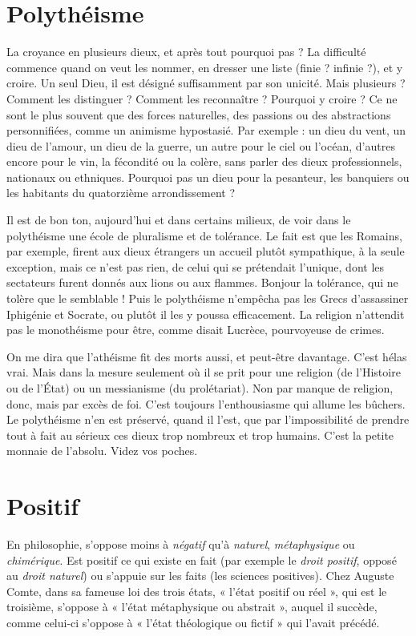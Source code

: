 \section{Polythéisme}
La croyance en plusieurs dieux, et après tout pourquoi pas ?
La difficulté commence quand on veut les nommer, en
dresser une liste (finie ? infinie ?), et y croire. Un seul Dieu, il est désigné suffisamment
par son unicité. Mais plusieurs ? Comment les distinguer ? Comment
les reconnaître ? Pourquoi y croire ? Ce ne sont le plus souvent que des forces
naturelles, des passions ou des abstractions personnifiées, comme un animisme
hypostasié. Par exemple : un dieu du vent, un dieu de l'amour, un dieu de la
guerre, un autre pour le ciel ou l’océan, d’autres encore pour le vin, la fécondité
ou la colère, sans parler des dieux professionnels, nationaux ou ethniques.
Pourquoi pas un dieu pour la pesanteur, les banquiers ou les habitants du quatorzième
arrondissement ?

Il est de bon ton, aujourd’hui et dans certains milieux, de voir dans le polythéisme
une école de pluralisme et de tolérance. Le fait est que les Romains, par
exemple, firent aux dieux étrangers un accueil plutôt sympathique, à la seule
exception, mais ce n’est pas rien, de celui qui se prétendait l'unique, dont les
sectateurs furent donnés aux lions ou aux flammes. Bonjour la tolérance, qui ne
tolère que le semblable ! Puis le polythéisme n’empêcha pas les Grecs d’assassiner
Iphigénie et Socrate, ou plutôt il les y poussa efficacement. La religion
n'attendit pas le monothéisme pour être, comme disait Lucrèce, pourvoyeuse
de crimes.

On me dira que l’athéisme fit des morts aussi, et peut-être davantage. C’est
hélas vrai. Mais dans la mesure seulement où il se prit pour une religion (de
l'Histoire ou de l’État) ou un messianisme (du prolétariat). Non par manque
de religion, donc, mais par excès de foi. C’est toujours l'enthousiasme qui
allume les bûchers. Le polythéisme n’en est préservé, quand il l’est, que par
l'impossibilité de prendre tout à fait au sérieux ces dieux trop nombreux et trop
humains. C’est la petite monnaie de l’absolu. Videz vos poches.

\section{Positif}
En philosophie, s'oppose moins à {\it négatif} qu’à {\it naturel}, {\it métaphysique}
ou {\it chimérique}. Est positif ce qui existe en fait (par exemple le {\it droit
positif}, opposé au {\it droit naturel}) ou s'appuie sur les faits (les sciences positives).
Chez Auguste Comte, dans sa fameuse loi des trois états, « l’état positif ou
réel », qui est le troisième, s'oppose à « l’état métaphysique ou abstrait », auquel
il succède, comme celui-ci s'oppose à « l’état théologique ou fictif » qui l'avait
précédé.

